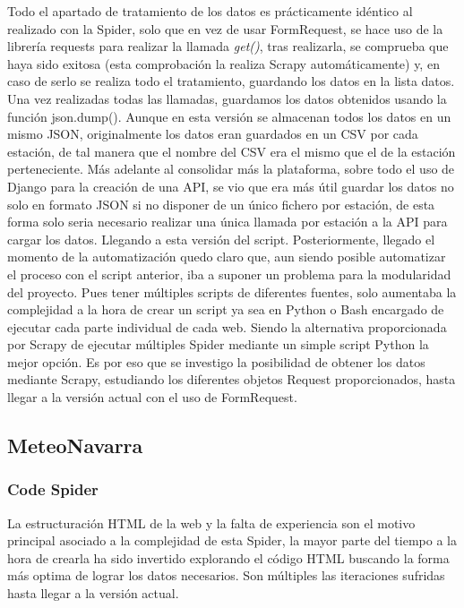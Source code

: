 Todo el apartado de tratamiento de los datos es prácticamente idéntico al realizado con la Spider, solo que en vez de usar FormRequest, se hace uso de la librería requests para realizar la llamada \textit{get()}, tras realizarla, se comprueba que haya sido exitosa (esta comprobación la realiza Scrapy automáticamente) y, en caso de serlo se realiza todo el tratamiento, guardando los datos en la lista datos. Una vez realizadas todas las llamadas, guardamos los datos obtenidos usando la función json.dump().\newline
\newline
Aunque en esta versión se almacenan todos los datos en un mismo JSON, originalmente los datos eran guardados en un CSV por cada estación, de tal manera que el nombre del CSV era el mismo que el de la estación perteneciente. Más adelante al consolidar más la plataforma, sobre todo el uso de Django para la creación de una API, se vio que era más útil guardar los datos no solo en formato JSON si no disponer de un único fichero por estación, de esta forma solo seria necesario realizar una única llamada por estación a la API para cargar los datos. Llegando a esta versión del script.\newline
\newline
Posteriormente, llegado el momento de la automatización quedo claro que, aun siendo posible automatizar el proceso con el script anterior, iba a suponer un problema para la modularidad del proyecto. Pues tener múltiples scripts de diferentes fuentes, solo aumentaba la complejidad a la hora de crear un script ya sea en Python o Bash encargado de ejecutar cada parte individual de cada web. Siendo la alternativa proporcionada por Scrapy de ejecutar múltiples Spider mediante un simple script Python la mejor opción.\newline
\newline
Es por eso que se investigo la posibilidad de obtener los datos mediante Scrapy, estudiando los diferentes objetos Request proporcionados, hasta llegar a la versión actual con el uso de FormRequest.

\subsection{MeteoNavarra}

\subsubsection{Code Spider}
La estructuración HTML de la web y la falta de experiencia son el motivo principal asociado a la complejidad de esta Spider, la mayor parte del tiempo a la hora de crearla ha sido invertido explorando el código HTML buscando la forma más optima de lograr los datos necesarios. Son múltiples las iteraciones sufridas hasta llegar a la versión actual.

